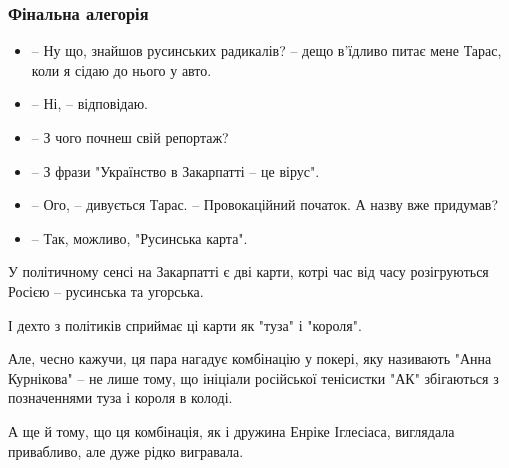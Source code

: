  
 
 

\subsubsection{Фінальна алегорія}

\begin{itemize}
  \item – Ну що, знайшов русинських радикалів? – дещо в’їдливо питає мене Тарас, коли я сідаю до нього у авто.
  \item – Ні, – відповідаю.
  \item – З чого почнеш свій репортаж?
  \item – З фрази "Українство в Закарпатті – це вірус".
  \item – Ого, – дивується Тарас. – Провокаційний початок. А назву вже придумав?
  \item – Так, можливо, "Русинська карта".
\end{itemize}

У політичному сенсі на Закарпатті є дві карти, котрі час від часу розігруються
Росією – русинська та угорська.

І дехто з політиків сприймає ці карти як "туза" і "короля".

Але, чесно кажучи, ця пара нагадує комбінацію у покері, яку називають "Анна
Курнікова" – не лише тому, що ініціали російської тенісистки "АК" збігаються з
позначеннями туза і короля в колоді.

А ще й тому, що ця комбінація, як і дружина Енріке Іглесіаса, виглядала
привабливо, але дуже рідко вигравала.
